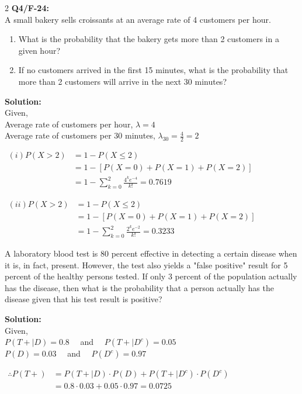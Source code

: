 \begin{multicols}{2}
\textbf{Q4/F-24:}\\[0.5em]
A small bakery sells croissants at an average rate of 4 customers per hour.
\vspace{-1em}
\begin{enumerate}[leftmargin=*, label=$(\roman*)$]
    \item What is the probability that the bakery gets more than 2 customers in a given hour?
    \item If no customers arrived in the first 15 minutes, what is the probability that more than 2 customers will arrive in the next 30 minutes?
\end{enumerate}

\textbf{Solution:}\\[0.5em]
Given,\\
Average rate of customers per hour, $\lambda = 4$\\
Average rate of customers per 30 minutes, $\lambda_{30} = \frac{4}{2} = 2$

$\begin{aligned}
   (i) P(X > 2)
   &= 1 - P(X \leq 2) \\
   &= 1 - [P(X=0) + P(X=1) + P(X=2)] \\
   &= 1 - \sum_{k=0}^{2} \frac{4^k e^{-4}}{k!}
   = 0.7619
\end{aligned}$


$\begin{aligned}
   (ii) P(X > 2)
   &= 1 - P(X \leq 2) \\
   &= 1 - [P(X=0) + P(X=1) + P(X=2)] \\
   &= 1 - \sum_{k=0}^{2} \frac{2^k e^{-2}}{k!}
   = 0.3233
\end{aligned}$


A laboratory blood test is 80 percent effective in detecting a certain disease when it is, in fact, present. However, the test also yields a "false positive" result for 5 percent of the healthy persons tested. If only 3 percent of the population actually has the disease, then what is the probability that a person actually has the disease given that his test result is positive?

\textbf{Solution:}\\[0.5em]
Given,\\
$P(T+\mid D) = 0.8$
\ \ and \ \ 
$P(T+\mid D^c) = 0.05$\\
$P(D) = 0.03$
\ \ and \ \ 
$P(D^c) = 0.97$

$\begin{aligned}
   \therefore P(T+)
   &= P(T+\mid D) \cdot P(D) + P(T+\mid D^c) \cdot P(D^c) \\
   &= 0.8 \cdot 0.03 + 0.05 \cdot 0.97  = 0.0725
\end{aligned}$


\end{multicols}
